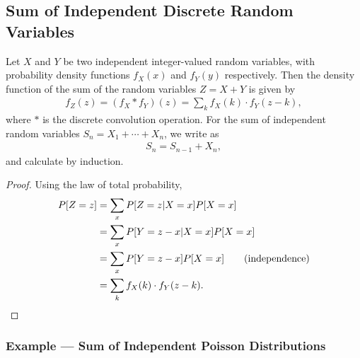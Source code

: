 \subsection*{Sum of Independent Discrete Random Variables}

\begin{theorem}\label{thrm:2}
	Let $X$ and $Y$ be two independent integer-valued random variables, with probability density functions $f_X(x)$ and $f_Y(y)$ respectively. Then the density function of the sum of the random variables $Z = X + Y$ is given by
	\begin{align*}
	f_Z(z) = (f_X * f_Y)(z) = \sum_k f_X(k)\cdot f_Y(z-k),
	\end{align*}
	where $*$ is the discrete convolution operation. For the sum of independent random variables $S_n = X_1 + \cdots + X_n$, we write as
	\begin{align*}
	S_n = S_{n-1} + X_n,
	\end{align*}
	and calculate by induction.
\end{theorem}
\begin{proof}
	Using the law of total probability,
	\begin{align*}
	P[Z = z] & = \sum_{x} P[Z = z|X = x]P[X = x] \\
	& = \sum_{x} P[Y = z-x|X = x]P[X = x] \\
	& = \sum_{x} P[Y = z-x]P[X = x] \qquad (\mathrm{independence})\\
	& = \sum_k f_X(k)\cdot f_Y(z-k).
	\end{align*}
\end{proof}

\subsubsection*{Example --- Sum of Independent Poisson Distributions}

